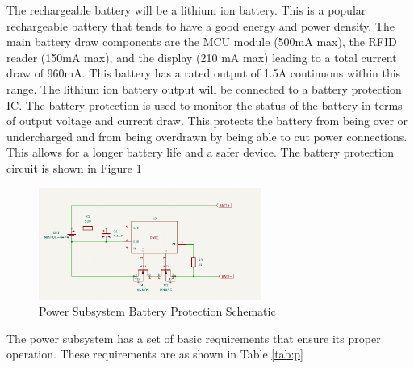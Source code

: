 \documentclass[12pt]{article}
\begin{document}
The rechargeable battery will be a lithium ion battery. This is a popular rechargeable battery that tends to have a good energy and power density. The main battery draw components are the MCU module (500mA max), the RFID reader (150mA max), and the display (210 mA max) leading to a total current draw of 960mA. This battery has a rated output of 1.5A continuous within this range. The lithium ion battery output will be connected to a battery protection IC. The battery protection is used to monitor the status of the battery in terms of output voltage and current draw. This protects the battery from being over or undercharged and from being overdrawn by being able to cut power connections. This allows for a longer battery life and a safer device. The battery protection circuit is shown in Figure \ref{fig:prot_schem}

\begin{figure}[!h]
	\centering
	\includegraphics[width=0.65\textwidth]{BatteryProtection-Schematic.png}
	\caption{Power Subsystem Battery Protection Schematic}
	\label{fig:prot_schem}
\end{figure}

The power subsystem has a set of basic requirements that ensure its proper operation. These requirements are as shown in Table \ref{tab:p}
\end{document}
